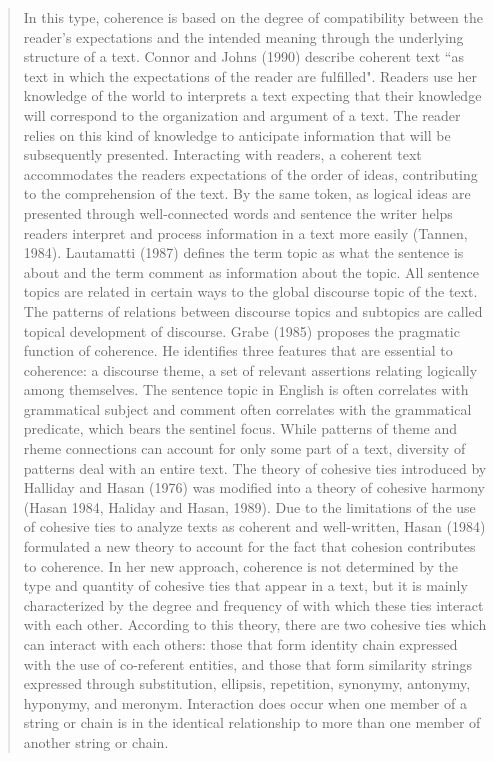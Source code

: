 \begin{quotation}
In this type, coherence is based on the degree of compatibility between the reader's expectations and the intended meaning through the underlying structure of a text. 
Connor and Johns (1990) describe coherent text ``as text in which the expectations of the reader are fulfilled".
Readers use her knowledge of the world to interprets a text expecting that their knowledge will correspond to the organization and argument of a text. 
The reader relies on this kind of knowledge to anticipate information that will be subsequently presented. 
Interacting with readers, a coherent text accommodates the readers expectations of the order of ideas, contributing to the comprehension of the text. 
By the same token, as logical ideas are presented through well-connected words and sentence the writer helps readers interpret and process information in a text more easily (Tannen, 1984).
Lautamatti (1987) defines the term topic as what the sentence is about and the term comment as information about the topic. 
All sentence topics are related in certain ways to the global discourse topic of the text. 
The patterns of relations between discourse topics and subtopics are called topical development of discourse. 
Grabe (1985) proposes the pragmatic function of coherence. 
He identifies three features that are essential to coherence: a discourse theme, a set of relevant assertions relating logically among themselves. 
The sentence topic in English is often correlates with grammatical subject and comment often correlates with the grammatical predicate, which bears the sentinel focus. 
While patterns of theme and rheme connections can account for only some part of a text, diversity of patterns deal with an entire text. 
The theory of cohesive ties introduced by Halliday and Hasan (1976) was modified into a theory of cohesive harmony (Hasan 1984, Haliday and Hasan, 1989). 
Due to the limitations of the use of cohesive ties to analyze texts as coherent and well-written, Hasan (1984) formulated a new theory to account for the fact that cohesion contributes to coherence. 
In her new approach, coherence is not determined by the type and quantity of cohesive ties that appear in a text, but it is mainly characterized by the degree and frequency of with which these ties interact with each other. 
According to this theory, there are two cohesive ties which can interact with each others: those that form identity chain expressed with the use of co-referent entities, and those that form similarity strings expressed through substitution, ellipsis, repetition, synonymy, antonymy, hyponymy, and meronym. 
Interaction does occur when one member of a string or chain is in the identical relationship to more than one member of another string or chain.


\end{quotation}
